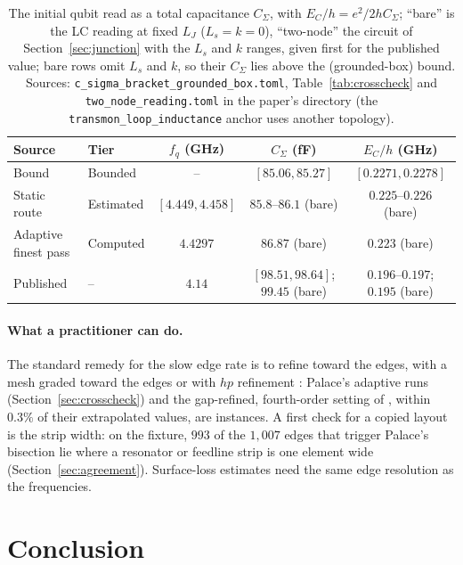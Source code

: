 \documentclass{anvil-paper}
\begin{document}
\begin{table}[htbp]
  \centering
  \caption{The initial qubit read as a total capacitance $C_\Sigma$, with
  $E_C/h = e^2/2hC_\Sigma$; ``bare'' is the LC reading at fixed $L_J$
  ($L_s = k = 0$), ``two-node'' the circuit of
  Section~\ref{sec:junction} with the $L_s$ and $k$ ranges, given first for
  the published value; bare rows omit $L_s$ and $k$, so their $C_\Sigma$
  lies above the (grounded-box) bound. Sources:
  \texttt{c\_sigma\_bracket\_grounded\_box.toml}, Table~\ref{tab:crosscheck}
  and \texttt{two\_node\_reading.toml} in the paper's directory (the
  \texttt{transmon\_loop\_inductance} anchor uses another topology).}
  \label{tab:design}
  \footnotesize
  \begin{tabular}{@{}llccc@{}}
    \toprule
    Source & Tier & $f_q$ (GHz) & $C_\Sigma$ (fF) & $E_C/h$ (GHz) \\
    \midrule
    Bound & Bounded & -- & $[85.06, 85.27]$ & $[0.2271, 0.2278]$ \\
    Static route & Estimated & $[4.449, 4.458]$ & $85.8$--$86.1$ (bare) & $0.225$--$0.226$ (bare) \\
    Adaptive finest pass & Computed & $4.4297$ & $86.87$ (bare) & $0.223$ (bare) \\
    Published & -- & $4.14$ & $[98.51, 98.64]$; $99.45$ (bare) & $0.196$--$0.197$; $0.195$ (bare) \\
    \bottomrule
  \end{tabular}
\end{table}

\paragraph{What a practitioner can do.}
The standard remedy for the slow edge rate is to refine toward the edges,
with a mesh graded toward the edges or with $hp$ refinement
\citep{demkowicz2006computing}: Palace's adaptive runs
(Section~\ref{sec:crosscheck}) and the gap-refined, fourth-order setting of
\citet{ye2025electromagnetic}, within $0.3\%$ of their extrapolated
values, are instances.
A first check for a copied layout is the strip width: on the fixture, $993$ of the $1{,}007$
edges that trigger Palace's bisection lie where a resonator or feedline
strip is one element wide (Section~\ref{sec:agreement}). Surface-loss estimates \citep{wang2015surface,martinis2022surface} need
the same edge resolution as the frequencies.

\section{Conclusion}
\label{sec:conclusion}
\end{document}
